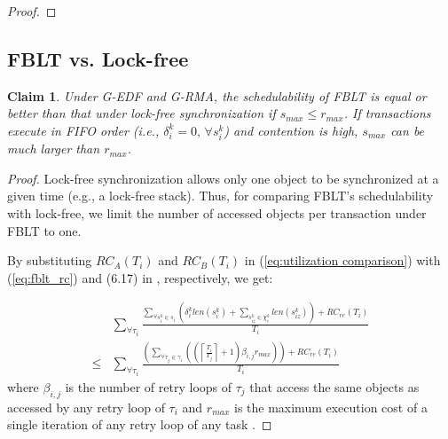 \documentclass[prodmode,acmtecs]{acmsmall}
\newtheorem{clm}{Claim}
\begin{document}
\begin{compactenum}
\begin{proof}
\end{proof}

\subsection{FBLT vs. Lock-free}
\label{sec:fblt vs lock free}

\begin{clm}\label{clm:fblt_edf_lock-free}
Under G-EDF and G-RMA, the schedulability of FBLT is equal or better than
that under lock-free synchronization if $s_{max}\le r_{max}$. If transactions execute in FIFO
order (i.e., $\delta_{i}^{k}=0,\,\forall s_{i}^{k}$) and contention
is high, $s_{max}$ can be much larger than $r_{max}$.
\end{clm}
\begin{proof}
Lock-free synchronization \cite{key-5,Herlihy:2006:AMP:1146381.1146382} allows only one object to be synchronized at a given time (e.g., a lock-free stack). 
Thus, for comparing FBLT's schedulability with lock-free, we limit the number of accessed objects per transaction under FBLT to one. 

By substituting $RC_{A}(T_{i})$ and $RC_{B}(T_{i})$ in (\ref{eq:utilization comparison})
with (\ref{eq:fblt_rc}) and (6.17) in \cite{shambake_phd_proposal}, 
respectively, we get:

\begin{eqnarray}
 & \sum_{\forall\tau_{i}}\frac{\sum_{\forall s_{i}^{k}\in s_{i}}\left(\delta_{i}^{k}len(s_{i}^{k})+\sum_{s_{iz}^{k}\in\chi_{i}^{k}}len(s_{iz}^{k})\right)+RC_{re}(T_{i})}{T_{i}}\label{eq:fblt_lf_comparison_1}\\
\le & \sum_{\forall\tau_{i}}\frac{\left(\sum_{\forall\tau_{j}\in\gamma_{i}}\left(\left(\left\lceil \frac{T_{i}}{T_{j}}\right\rceil +1\right)\beta_{i,j}r_{max}\right)\right)+RC_{re}(T_{i})}{T_{i}}\nonumber 
\end{eqnarray}
where $\beta_{i,j}$ is the number of retry loops of $\tau_{j}$ that
access the same objects as accessed by any retry loop of $\tau_{i}$
\cite{key-5} and $r_{max}$ is the maximum execution cost of a single
iteration of any retry loop of any task \cite{key-5}. 



\end{proof}
\end{compactenum}
\end{document}

